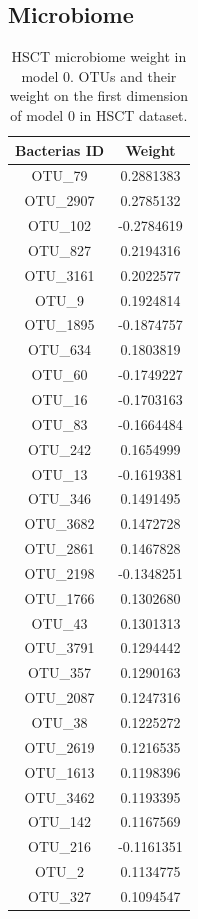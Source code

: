 \documentclass[
  12pt,
  a4paper,
  twoside,
  openright]{book}
\begin{document}
\hypertarget{microbiome-2}{%
\subsection{Microbiome}\label{microbiome-2}}

\begin{longtable}[t]{cc}
\caption[HSCT microbiome weight in model 0]{\label{tab:hsct-microbiome}HSCT microbiome weight in model 0. OTUs and their weight on the first dimension of model 0 in HSCT dataset.}\\
\toprule
Bacterias ID & Weight\\
\midrule
OTU\_79 & 0.2881383\\
OTU\_2907 & 0.2785132\\
OTU\_102 & -0.2784619\\
OTU\_827 & 0.2194316\\
OTU\_3161 & 0.2022577\\
\addlinespace
OTU\_9 & 0.1924814\\
OTU\_1895 & -0.1874757\\
OTU\_634 & 0.1803819\\
OTU\_60 & -0.1749227\\
OTU\_16 & -0.1703163\\
\addlinespace
OTU\_83 & -0.1664484\\
OTU\_242 & 0.1654999\\
OTU\_13 & -0.1619381\\
OTU\_346 & 0.1491495\\
OTU\_3682 & 0.1472728\\
\addlinespace
OTU\_2861 & 0.1467828\\
OTU\_2198 & -0.1348251\\
OTU\_1766 & 0.1302680\\
OTU\_43 & 0.1301313\\
OTU\_3791 & 0.1294442\\
\addlinespace
OTU\_357 & 0.1290163\\
OTU\_2087 & 0.1247316\\
OTU\_38 & 0.1225272\\
OTU\_2619 & 0.1216535\\
OTU\_1613 & 0.1198396\\
\addlinespace
OTU\_3462 & 0.1193395\\
OTU\_142 & 0.1167569\\
OTU\_216 & -0.1161351\\
OTU\_2 & 0.1134775\\
OTU\_327 & 0.1094547\\
\bottomrule
\end{longtable}
\end{document}
